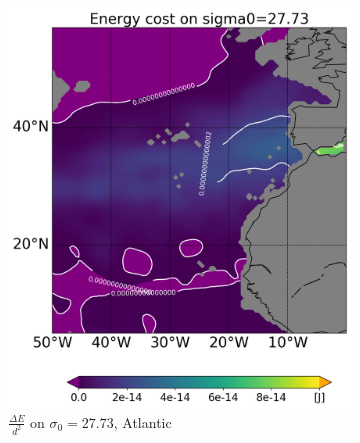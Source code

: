 \begin{figure}[htbp]
    \centering
     \begin{subfigure}[b]{0.4\textwidth}
         
         \includegraphics[width=\textwidth]{plots/energy/atlantic_energy/Map2dcyl_energy_on_sigma0_2773e-2_reg310Eto360E05Nto57N_1990to1998av_WOCE.png}
         \caption{$\frac{\Delta E}{d^2}$ on $\sigma_0 = 27.73$, Atlantic}
         \label{fig:subplot_atlantic_energy_sigma_0}
     \end{subfigure}
     \hfill
     \begin{subfigure}[b]{0.4\textwidth}
         

\end{subfigure}
\end{figure}
